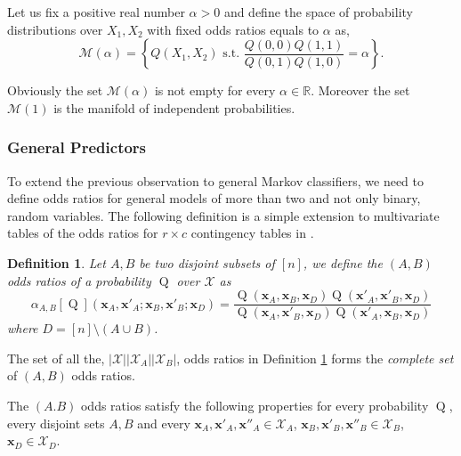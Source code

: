 \documentclass[11pt,a4paper, twoside]{book}
\newtheorem{definition}{Definition}[chapter]
\newcommand{\indep}{\rotatebox[origin=c]{90}{$\models$}}
\newcommand{\Pq}{\operatorname{Q}}
\newcommand{\bx}{\mathbf{x}}
\newcommand{\bchi}{\boldsymbol{\mathcal{X}}}
\begin{document}
Let us fix a positive real number $\alpha>0$ and define the space of probability distributions over $X_1,X_2$ with fixed odds ratios equals to $\alpha$ as,
$$ \mathcal{M}(\alpha)= \left\{Q(X_1,X_2) \text{ s.t. } \frac{Q(0,0)Q(1,1)}{Q(0,1)Q(1,0)}= \alpha \right\}.$$

Obviously the set $\mathcal{M}(\alpha)$ is not empty for every $\alpha \in \mathbb{R}$. Moreover the set $\mathcal{M}(1)$ is the manifold of independent probabilities. 

\subsubsection{General Predictors}

To extend the previous observation to general Markov classifiers, we need to define odds ratios for general models of more than two and not only binary, random variables.
The following definition is a simple extension to multivariate tables of the odds ratios for $r \times c$ contingency tables in \cite{fienberg1968}.

\begin{definition}
Let $A,B$ be two disjoint subsets of $[n]$, we define the $(A,B)$ odds ratios of a probability $\Pq$ over $\bchi$ as
$$ \alpha_{A,B}[\Pq](\mathbf{x}_A,\mathbf{x}'_A;\mathbf{x}_B,\mathbf{x}'_B;\mathbf{x}_D)= \frac{\Pq(\mathbf{x}_A,\mathbf{x}_B,\mathbf{x}_D)\Pq(\mathbf{x}'_A,\mathbf{x}'_B,\mathbf{x}_D)}{\Pq(\mathbf{x}_A,\mathbf{x}'_B,\mathbf{x}_D)\Pq(\mathbf{x}'_A,\mathbf{x}_B,\mathbf{x}_D)}$$
where $D=[n]\setminus (A \cup B)$.
\label{def:or}
\end{definition}

The set of all the, $|\bchi||\bchi_A||\bchi_B|$, odds ratios in Definition \ref{def:or} forms the \textit{complete set} of $(A,B)$ odds ratios.

The $(A.B)$ odds ratios satisfy the following properties for every probability $\Pq$, every disjoint sets $A,B$ and every $\bx_A, \bx'_A, \bx''_A \in \bchi_A$, $\bx_B, \bx'_B, \bx''_B \in \bchi_B$, $\bx_D \in \bchi_D$.
\end{document}
